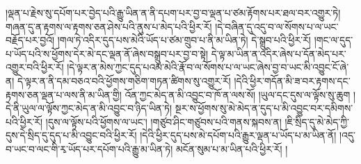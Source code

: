 །ལྡན་པ་རྗེས་སུ་དཔོག་པར་བྱེད་པའི་རྒྱུ་ཡིན་ན་ནི་དཔག་པར་བྱ་བ་ལྡན་པ་ཙམ་རྟོགས་པར་ཐལ་བར་འགྱུར་ཏེ། གཞན་དུ་ན་རྟགས་ལ་རྟགས་ཅན་ཤེས་པའི་ནུས་པ་མེད་པའི་ཕྱིར་རོ། །དེ་བཞིན་དུ་འདུ་བ་ལ་སོགས་པ་ལ་ཡང་བརྗོད་པར་བྱའོ། །གལ་ཏེ་འདིར་དུད་པས་མེའི་ཡོད་པ་ཙམ་གྲུབ་པ་ནི་མ་ཡིན་ཏེ། དེ་སྒྲུབ་པའི་ཕྱིར་རོ། །གང་ལ་དུད་པ་ཡོད་པའི་ས་ཕྱོགས་དེར་མེ་དང་ལྡན་ནོ་ཞེས་བསྒྲུབ་པར་བྱ་བ་སྟེ། དེ་ལྟ་མ་ཡིན་ན་འདིར་ཞེས་པ་དོན་མེད་པར་འགྱུར་བའི་ཕྱིར་རོ། །དེ་ལྟར་ན་མེས་ཀྱང་དུད་པའམ་མེའི་རྣོ་བ་ལ་སོགས་པ་ལ་ཡང་ཞེས་བྱ་བ་ཡང་མི་འབྱུང་ངོ་ཞེ་ན། དེ་ལྟར་ན་ནི་དམ་བཅའ་བའི་ཕྱོགས་གཅིག་གཏན་ཚིགས་སུ་འགྱུར་རོ། །དེའི་ཕྱིར་གདོན་མི་ཟ་བར་རྟགས་དང་རྟགས་ཅན་ལྡན་པ་ལས་ནི་མ་ཡིན་གྱི། འོན་ཀྱང་མེད་ན་མི་འབྱུང་བ་ཁོ་ན་ལས་སོ། །ཡུལ་དང་དུས་ལ་ལྟོས་སུ་ཆུག །དེ་ནི་ཡུལ་ལ་ལྟོས་ཀྱང་མེད་ན་མི་འབྱུང་བ་ཉིད་ཡིན་ཏེ། སྔར་ས་ཕྱོགས་སུ་མེ་མེད་ན་དུད་པ་མི་འབྱུང་བར་དམིགས་པའི་ཕྱིར་རོ། །དུས་ལ་ལྟོས་པའི་ཕྱོགས་ལ་ཡང་། །གཙུབ་ཤིང་གཙུབས་པའི་གནས་སྐབས་ན། །ཇི་སྲིད་དུ་མེ་མེད་ཀྱི་དུས་དེ་སྲིད་དུ་དུད་པ་མི་འབྱུང་བའི་ཕྱིར་རོ། །དེའི་ཕྱིར་དུད་པས་མེ་དཔོག་པའི་རྒྱུར་ལྡན་པ་ཡོད་པ་མ་ཡིན་ནོ། །འདུ་བ་ཡང་བ་ལང་གི་རྭ་ཡོད་པར་དཔོག་པའི་རྒྱུ་མ་ཡིན་ཏེ། མངོན་སུམ་པ་མ་ཡིན་པའི་ཕྱིར་རོ། །
